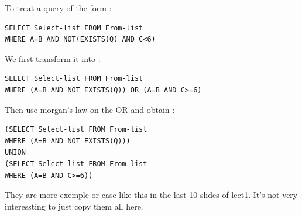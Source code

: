 \documentclass[12pt,a4paper]{article}
\begin{document}
To treat a query of the form :
\begin{verbatim}
SELECT Select-list FROM From-list 
WHERE A=B AND NOT(EXISTS(Q) AND C<6)
\end{verbatim}
We first transform it into :
\begin{verbatim}
SELECT Select-list FROM From-list
WHERE (A=B AND NOT EXISTS(Q)) OR (A=B AND C>=6)
\end{verbatim}
Then use morgan's law on the OR and obtain :
\begin{verbatim}
(SELECT Select-list FROM From-list 
WHERE (A=B AND NOT EXISTS(Q))) 
UNION
(SELECT Select-list FROM From-list 
WHERE (A=B AND C>=6))
\end{verbatim}
They are more exemple or case like this in the last 10 slides of lect1. It's not very interessting to just copy them all here.
\end{document}
